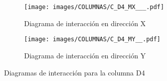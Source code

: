 
\begin{figure}[H]
     \centering
     \begin{subfigure}[b]{0.45\textwidth}
         \centering
         \texttt{[image: images/COLUMNAS/C\_D4\_MX\_\_\_.pdf]}
         \caption{Diagrama de interacción en dirección X}
         \label{fig:CD4 X}
     \end{subfigure}
     \hfill
     \begin{subfigure}[b]{0.45\textwidth}
         \centering
         \texttt{[image: images/COLUMNAS/C\_D4\_MY\_\_.pdf]}
         \caption{Diagrama de interacción en dirección Y}
         \label{fig:CD4 Y}
     \end{subfigure}
    
        \caption{Diagramas de interacción para la columna D4}
        \label{fig:D4}
\end{figure}






